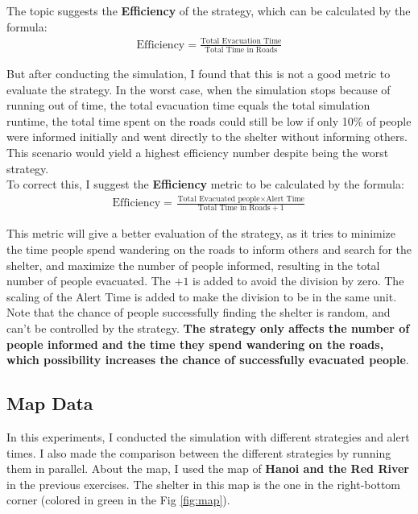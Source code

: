 \documentclass[12pt]{article}
\begin{document}
The topic suggests the \textbf{Efficiency} of the strategy, which can be calculated by the formula:
\begin{align*}
    \text{Efficiency} = \frac{\text{Total Evacuation Time}}{\text{Total Time in Roads}}
\end{align*}

But after conducting the simulation, I found that this is not a good metric to evaluate the strategy. In the worst case, when the simulation stops because of running out of time, the total evacuation time equals the total simulation runtime, the total time spent on the roads could still be low if only 10\% of people were informed initially and went directly to the shelter without informing others. This scenario would yield a highest efficiency number despite being the worst strategy.\\

To correct this, I suggest the \textbf{Efficiency} metric to be calculated by the formula:
\begin{align*}
    \text{Efficiency} = \frac{\text{Total Evacuated people} \times \text{Alert Time}}{\text{Total Time in Roads} + 1}
\end{align*}

This metric will give a better evaluation of the strategy, as it tries to minimize the time people spend wandering on the roads to inform others and search for the shelter, and maximize the number of people informed, resulting in the total number of people evacuated. The $\text{+1}$ is added to avoid the division by zero. The scaling of the $\text{Alert Time}$ is added to make the division to be in the same unit.\\

Note that the chance of people successfully finding the shelter is random, and can't be controlled by the strategy. \textbf{The strategy only affects the number of people informed and the time they spend wandering on the roads, which possibility increases the chance of successfully evacuated people}.\\

\subsection{Map Data}
In this experiments, I conducted the simulation with different strategies and alert times. I also made the comparison between the different strategies by running them in parallel. About the map, I used the map of \textbf{Hanoi and the Red River} in the previous exercises. The shelter in this map is the one in the right-bottom corner (colored in green in the Fig \ref{fig:map}).\\ 
\end{document}
